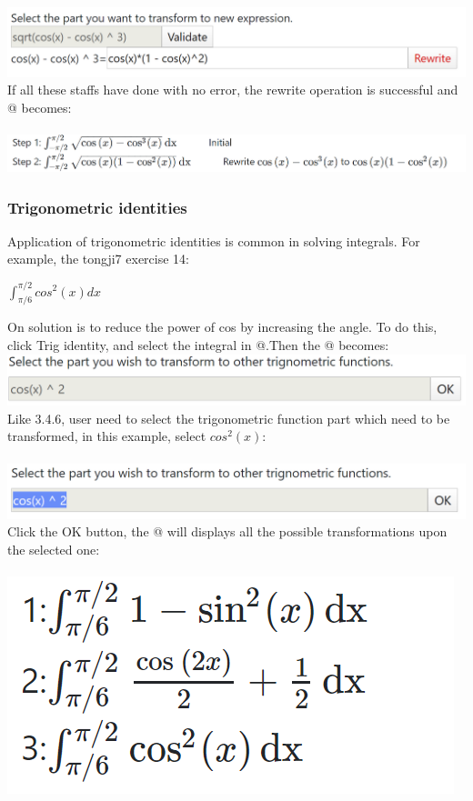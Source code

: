 \documentclass[titlepage]{article}
\makeatletter
\newcommand*{\rom}[1]{\expandafter\@slowromancap\romannumeral #1@}
\makeatother
\begin{document}
\includegraphics{20.png}\\
If all these staffs have done with no error, the rewrite operation is successful and \rom{3} becomes:\\\\
\includegraphics[width=14.5cm]{21.png}\\
\subsubsection{Trigonometric identities}
Application of trigonometric identities is common in solving integrals. For example, the tongji7 exercise 14:
\begin{center}
$\int_{\pi/6}^{\pi/2} cos^{2}(x) dx$
\end{center}
On solution is to reduce the power of cos by increasing the angle. To do this, click \colorbox{mygray}{Trig identity}, and select the integral in \rom{4}.Then the \rom{5} becomes:\\
\includegraphics{22.png}\\
Like 3.4.6, user need to select the trigonometric function part which need to be transformed, in this example, select $cos^{2}(x)$:\\\\
\includegraphics{23.png}\\
Click the \colorbox{mygray}{OK} button, the \rom{5} will displays all the possible transformations upon the selected one:\\\\
\includegraphics{24.png}\\
\end{document}
